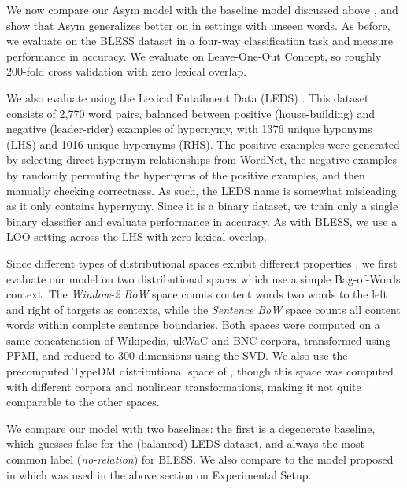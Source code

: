 We now compare our Asym model with the baseline model discussed above
\cite{baroni:2012:eacl}, and show that Asym generalizes better on in settings
with unseen words. As before, we evaluate on the BLESS dataset in a four-way
classification task and measure performance in accuracy. We evaluate on
Leave-One-Out Concept, so roughly 200-fold cross validation with zero lexical
overlap.

We also evaluate using the Lexical Entailment Data (LEDS)
\cite{baroni:2012:eacl}. This dataset consists of 2,770 word pairs, balanced
between positive (house-building) and negative (leader-rider) examples of
hypernymy, with 1376 unique hyponyms (LHS) and 1016 unique hypernyms (RHS). The
positive examples were generated by selecting direct hypernym relationships
from WordNet, the negative examples by randomly permuting the hypernyms of the
positive examples, and then manually checking correctness. As such, the LEDS
name is somewhat misleading as it only contains hypernymy. Since it is a binary
dataset, we train only a single binary classifier and evaluate performance in
accuracy. As with BLESS, we use a LOO setting across the LHS with zero lexical
overlap.

Since different types of distributional spaces exhibit different properties
\cite{pado:2007:cl}, we first evaluate our model on two distributional
spaces which use a simple Bag-of-Words context.  The {\em Window-2 BoW} space
counts content words two words to the left and right of targets as contexts,
while the {\em Sentence BoW} space counts all content words within complete
sentence boundaries. Both spaces were computed on a same concatenation of
Wikipedia, ukWaC and BNC corpora, transformed using PPMI, and reduced to 300
dimensions using the SVD. We also use the precomputed TypeDM distributional
space of , though this space was computed with
different corpora and nonlinear transformations, making it not quite comparable
to the other spaces.

We compare our model with two baselines: the first is a degenerate baseline,
which guesses false for the (balanced) LEDS dataset, and always
the most common label ({\em no-relation}) for BLESS. We also compare to the
model proposed in  which was used in the above
section on Experimental Setup.

